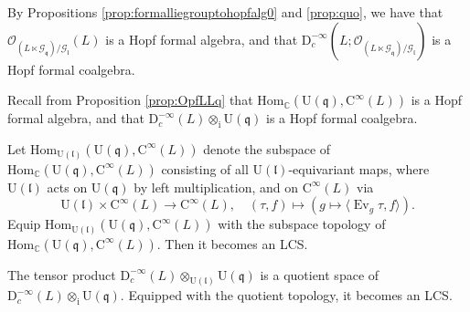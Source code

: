 \documentclass[12pt, a4paper]{amsart}
\newcommand{\BC}{{\mathbb {C}}}
\newcommand{\CG}{{\mathcal {G}}}
\newcommand{\CO}{{\mathcal {O}}}
\newcommand{\RC}{{\mathrm {C}}}
\newcommand{\RD}{{\mathrm {D}}}
\newcommand{\Ri}{{\mathrm{i}}}
\newcommand{\RU}{{\mathrm {U}}}
\newcommand{\Hom}{{\mathrm{Hom}}}
\newcommand{\Ev}{\operatorname{Ev}}
\newcommand{\q}{\mathfrak q}
\renewcommand{\l}{\mathfrak l}
\newcommand{\la}{\langle}
\newcommand{\ra}{\rangle}
\theoremstyle{Theorem}
\theoremstyle{Theorem}
\theoremstyle{Theorem}
\theoremstyle{Theorem}
\theoremstyle{Plain}
\theoremstyle{remark}
\theoremstyle{remark}
\theoremstyle{Definition}
\numberwithin{equation}{section}
\begin{document}
By Propositions \ref{prop:formalliegrouptohopfalg0} and \ref{prop:quo}, we have that 
$\CO_{(L\ltimes \CG_{\q})/\CG_{\l}}(L)$ is a  Hopf formal  algebra, and that 
$\RD^{-\infty}_c(L;\CO_{(L\ltimes \CG_{\q})/\CG_{\l}})$ is a Hopf formal coalgebra.

Recall from Proposition \ref{prop:OpfLLq} that $\Hom_{\BC}(\RU(\q),\RC^{\infty}(L))$ is a  Hopf formal algebra, and that $\RD^{-\infty}_c(L)\otimes_{\Ri}\RU(\q)$ is a Hopf formal coalgebra. 

Let $\Hom_{\RU(\l)}(\RU(\q),\RC^{\infty}(L))$ denote the subspace  of $\Hom_{\BC}(\RU(\q),\RC^{\infty}(L))$ consisting of all $\RU(\l)$-equivariant maps, where $\RU(\l)$ acts on $\RU(\q)$ by left multiplication, and on $\RC^{\infty}(L)$ via
\[\RU(\l)\times \RC^{\infty}(L)\rightarrow \RC^{\infty}(L),\quad
(\tau,f)\mapsto(g\mapsto \la \Ev_g\tau,f\ra%
).
\] Equip $\Hom_{\RU(\l)}(\RU(\q),\RC^{\infty}(L))$ with the subspace topology of $\Hom_{\BC}(\RU(\q),\RC^{\infty}(L))$. Then it becomes an LCS.

The tensor product $\RD^{-\infty}_c(L)\otimes_{\RU(\l)}\RU(\q)$ is a quotient space of $\RD^{-\infty}_c(L)\otimes_{\Ri}\RU(\q)$. Equipped with the quotient topology, it becomes an LCS.



\end{document}
